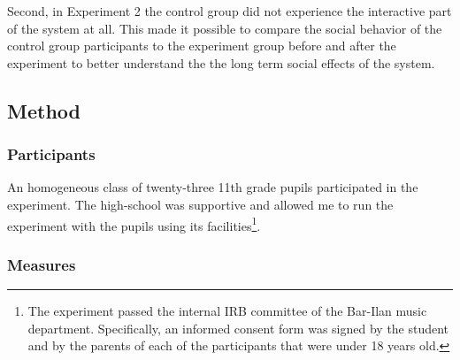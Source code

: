 \documentclass[a4paper,11pt]{article}
\begin{document}
{Second, in Experiment 2 the control group did not experience the interactive part of the system at all.
This made it possible to compare the social behavior of the control group participants to the experiment group before and after the experiment to better understand the the long term social effects of the system.

\subsection{Method}\label{methods:evaluation}

\subsubsection{Participants}

An homogeneous class of twenty-three 11th grade pupils participated in the experiment.
The high-school was supportive and allowed me to run the experiment with the pupils using its facilities\footnote{The experiment passed the internal IRB committee of the Bar-Ilan music department. Specifically, an informed consent form was signed by the student and by the parents of each of the participants that were under 18 years old.}.

\subsubsection{Measures}

}
\end{document}
